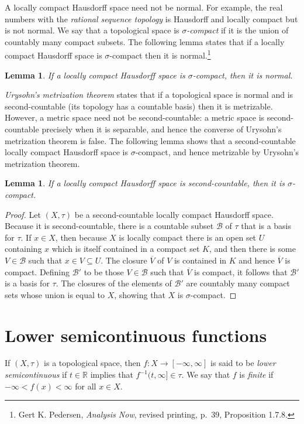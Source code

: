\documentclass{article}
\newtheorem{lemma}[theorem]{Lemma}
\theoremstyle{definition}
\begin{document}
A locally compact Hausdorff space need not be normal. For example, the real numbers with the {\em rational sequence topology} is Hausdorff and locally compact but is not normal. We say that a topological space
is {\em $\sigma$-compact} if it is the union of countably many compact subsets. The following lemma states that if a locally compact Hausdorff space is $\sigma$-compact
then it is normal.\footnote{Gert K. Pedersen, {\em Analysis Now}, revised printing, p.~39, Proposition 1.7.8.} 

\begin{lemma}
If a locally compact Hausdorff space is $\sigma$-compact, then it is normal.
\end{lemma}

{\em Urysohn's metrization theorem} states that if a topological space is normal and is second-countable (its topology has a countable basis) then it is metrizable. However, a metric space need not be second-countable: a metric space is second-countable precisely when it is separable, and hence
the converse of Urysohn's metrization theorem is false. The following lemma shows that a second-countable locally compact Hausdorff space is $\sigma$-compact,
and hence metrizable by Urysohn's metrization theorem.

\begin{lemma}
If a locally compact Hausdorff space is second-countable, then it is $\sigma$-compact.
\end{lemma}
\begin{proof}
Let $(X,\tau)$ be a second-countable locally compact Hausdorff space. Because it is second-countable, there is a countable subset $\mathscr{B}$ of $\tau$ that is a basis for
$\tau$. 
If $x \in X$, then because $X$ is locally compact there is an open set $U$ containing $x$ which is itself contained in a compact set $K$, and then there is some $V \in \mathscr{B}$
such that $x \in V \subseteq U$. The closure $\overline{V}$ of $V$ is contained in $K$ and hence $\overline{V}$ is compact.
Defining $\mathscr{B}'$ to be those $V \in \mathscr{B}$ such that $\overline{V}$ is compact,
it follows that $\mathscr{B}'$ is a basis for $\tau$. The closures of the elements of $\mathscr{B}'$ are countably many compact sets whose union is equal to $X$, showing that
$X$ is $\sigma$-compact.
\end{proof}


\section{Lower semicontinuous functions}
If $(X,\tau)$ is a topological space, then $f:X \to [-\infty,\infty]$ is said to be {\em lower semicontinuous} if $t \in \mathbb{R}$ implies that
$f^{-1}(t,\infty] \in \tau$. We say that $f$ is {\em finite} if $-\infty<f(x) < \infty$ for all $x \in X$. 
\end{document}
